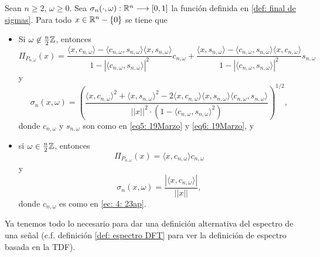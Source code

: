 \begin{prop}
\label{prp: ammm}
Sean $n \geq 2$, $\omega \geq 0$. 
Sea $\sigma_{n}(\cdot,\omega): \mathbb{R}^{n} \longrightarrow [0,1]$
la función definida en \ref{def: final de sigmas}.
Para todo $x \in \mathbb{R}^{n}-\{ 0 \}$
se tiene que
\begin{itemize}
	\item Si $\omega \not\in \frac{n}{2} \mathbb{Z}$, entonces
	\begin{equation}
	\label{eq: pi ommm 1}
	 \Pi_{P_{n, \omega}}(x) = 
\frac{
\langle x, c_{n, \omega} \rangle - \langle c_{n, \omega}, s_{n, \omega} \rangle 
\langle x, s_{n, \omega} \rangle
}
{1-|\langle c_{n, \omega}, s_{n, \omega} \rangle |^{2}  }
c_{n, \omega} +
\frac{
\langle x, s_{n, \omega} \rangle - \langle c_{n, \omega}, s_{n, \omega} \rangle 
\langle x, c_{n, \omega} \rangle
}
{1-|\langle c_{n, \omega}, s_{n, \omega} \rangle |^{2}  }
s_{n, \omega}
	\end{equation}
	y 
	\begin{equation}
	\label{eq: coef sigma caso 1}
	\sigma_{n}(x, \omega) =
	\left(		  
		  \frac{\langle x, c_{n, \omega } \rangle^{2} +  \langle x, s_{n, \omega } \rangle^{2}	
	       -2  \langle x, c_{n, \omega } \rangle \langle x, s_{n, \omega } \rangle \langle c_{n, \omega }, s_{n, \omega } \rangle}{ || x ||^{2} \cdot
	       (1- \langle c_{n, \omega }, s_{n, \omega } \rangle^{2})}	  
\right) ^{1/2},
	\end{equation}
donde $c_{n, \omega}$ y $s_{n, \omega}$ son como en 
\eqref{eq5: 19Marzo} y \eqref{eq6: 19Marzo}, y

\item si $\omega \in \frac{n}{2} \mathbb{Z}$, entonces 
\begin{equation}
\label{eq: pi ommm 2}
\Pi_{P_{n, \omega}}(x) = \langle x, c_{n, \omega} \rangle c_{n, \omega}
\end{equation}
y 
\begin{equation}
\label{eq: sfklmslsfl}
\sigma_{n}(x, \omega) = \frac{|\langle x, c_{n, \omega} \rangle |}{||x||},
\end{equation}
donde $c_{n, \omega}$ es como en \eqref{ec: 4: 23ap}.
\end{itemize}
\end{prop}



Ya tenemos todo lo necesario para dar una definición alternativa 
del espectro de una señal 
(c.f. definición
\ref{def: espectro DFT} para ver la definición de espectro
basada en la TDF).


